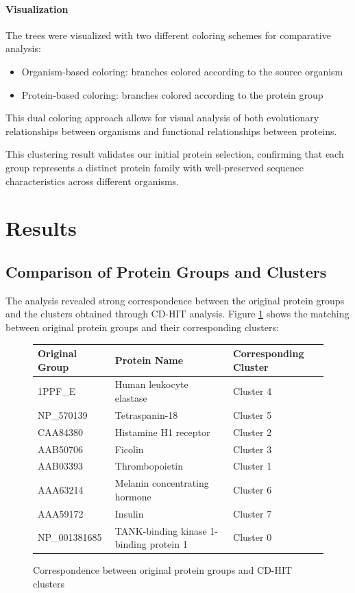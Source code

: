 \documentclass[11pt, a4paper, hidelinks]{article}
\begin{document}
\paragraph{Visualization}
The trees were visualized with two different coloring schemes for comparative analysis:
\begin{itemize}
    \item Organism-based coloring: branches colored according to the source organism
    \item Protein-based coloring: branches colored according to the protein group
\end{itemize}

\noindent This dual coloring approach allows for visual analysis of both evolutionary relationships between organisms and functional relationships between proteins.

\noindent This clustering result validates our initial protein selection, confirming that each group represents a distinct protein family with well-preserved sequence characteristics across different organisms.

\section{Results}\label{sec:random-sequence-generation}

\subsection{Comparison of Protein Groups and Clusters}\label{subsec:comparison-of-protein-groups-and-clusters}

The analysis revealed strong correspondence between the original protein groups and the clusters obtained through CD-HIT analysis. Figure \ref{fig:tree_comparison} shows the matching between original protein groups and their corresponding clusters:

\begin{figure}[H]
    \centering
    \begin{tabular}{|l|l|l|}
        \hline
        \textbf{Original Group} & \textbf{Protein Name} & \textbf{Corresponding Cluster} \\
        \hline
        1PPF\_E & Human leukocyte elastase & Cluster 4 \\
        NP\_570139 & Tetraspanin-18 & Cluster 5 \\
        CAA84380 & Histamine H1 receptor & Cluster 2 \\
        AAB50706 & Ficolin & Cluster 3 \\
        AAB03393 & Thrombopoietin & Cluster 1 \\
        AAA63214 & Melanin concentrating hormone & Cluster 6 \\
        AAA59172 & Insulin & Cluster 7 \\
        NP\_001381685 & TANK-binding kinase 1-binding protein 1 & Cluster 0 \\
        \hline
    \end{tabular}
    \caption{Correspondence between original protein groups and CD-HIT clusters}
    \label{fig:tree_comparison}
\end{figure}
\end{document}
